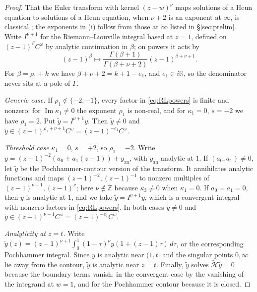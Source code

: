 \documentclass[11pt]{amsart}
\theoremstyle{definition}
\theoremstyle{remark}
\numberwithin{equation}{section}
\newcommand{\R}{\mathbb{R}}
\newcommand{\Z}{\mathbb{Z}}
\renewcommand{\Im}{\operatorname{Im}}
\begin{document}
\begin{proof}
That the Euler transform with kernel $(z-w)^{\nu}$ maps solutions of a Heun equation to solutions of a Heun
equation, when $\nu+2$ is an exponent at $\infty$, is classical \cite{KS96,Tak03}; the exponents in (i) follow from
those at $\infty$ listed in \S\ref{sec:prelim}. Write $I^{\nu+1}$ for the Riemann--Liouville integral based at
$z=1$, defined on $(z-1)^{\beta}C^\omega$ by analytic continuation in $\beta$; on powers it acts by
\begin{equation}\label{eq:RLpowers}
(z-1)^{\beta}\mapsto\frac{\Gamma(\beta+1)}{\Gamma(\beta+\nu+2)}(z-1)^{\beta+\nu+1}.
\end{equation}
For $\beta=\rho_1+k$ we have $\beta+\nu+2=k+1-e_1$, and $e_1\in i\R$, so the denominator never sits at a pole of
$\Gamma$.

\emph{Generic case.} If $\rho_1\notin\{-2,-1\}$, every factor in \eqref{eq:RLpowers} is finite and nonzero: for
$\Im\kappa_1\neq0$ the exponent $\rho_1$ is non-real, and for $\kappa_1=0$, $s=-2$ we have $\rho_1=2$. Put
$\tilde y=I^{\nu+1}y$. Then $\tilde y\neq0$ and $\tilde y\in(z-1)^{\rho_1+\nu+1}C^\omega=(z-1)^{-e_1}C^\omega$.

\emph{Threshold case} $\kappa_1=0$, $s=+2$, so $\rho_1=-2$. Write $y=(z-1)^{-2}(a_0+a_1(z-1))+y_{\mathrm{an}}$, with
$y_{\mathrm{an}}$ analytic at $1$. If $(a_0,a_1)\ne0$, let $\tilde y$ be the Pochhammer-contour version of the
transform. It annihilates analytic functions and maps $(z-1)^{-2},(z-1)^{-1}$ to nonzero multiples of
$(z-1)^{\nu-1},(z-1)^{\nu}$; here $\nu\notin\Z$ because $\kappa_3\ne0$ when $\kappa_1=0$. If $a_0=a_1=0$, then
$y$ is analytic at $1$, and we take $\tilde y=I^{\nu+1}y$, which is a convergent integral with nonzero factors in
\eqref{eq:RLpowers}. In both cases $\tilde y\ne0$ and $\tilde y\in(z-1)^{\nu-1}C^\omega=(z-1)^{-e_1}C^\omega$.

\emph{Analyticity at $z=t$.} Write $\tilde y(z)=(z-1)^{\nu+1}\int_0^1(1-\tau)^\nu y(1+(z-1)\tau)\,d\tau$, or the
corresponding Pochhammer integral. Since $y$ is analytic near $(1,t]$ and the singular points $0,\infty$ lie away
from the contour, $\tilde y$ is analytic near $z=t$. Finally, $\tilde y$ solves $\widetilde{\mathcal H}\tilde y=0$
because the boundary terms vanish: in the convergent case by the vanishing of the integrand at $w=1$, and for the
Pochhammer contour because it is closed.
\end{proof}
\end{document}
